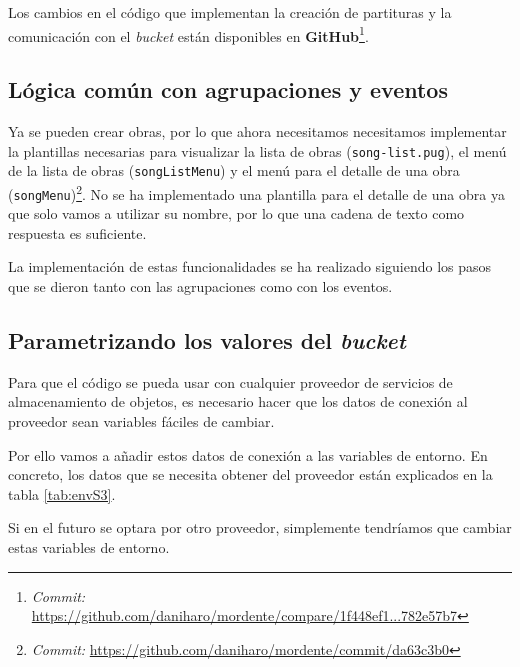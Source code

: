 Los cambios en el código que implementan la creación de partituras y la comunicación con el \textit{bucket} están disponibles en \textbf{GitHub}\footnote{\textit{Commit:} \url{https://github.com/daniharo/mordente/compare/1f448ef1...782e57b7}}.

\subsection{Lógica común con agrupaciones y eventos}

Ya se pueden crear obras, por lo que ahora necesitamos necesitamos implementar la plantillas necesarias para visualizar la lista de obras (\texttt{song-list.pug}), el menú de la lista de obras (\texttt{songListMenu}) y el menú para el detalle de una obra (\texttt{songMenu})\footnote{\textit{Commit:} \url{https://github.com/daniharo/mordente/commit/da63c3b0}}. No se ha implementado una plantilla para el detalle de una obra ya que solo vamos a utilizar su nombre, por lo que una cadena de texto como respuesta es suficiente.

La implementación de estas funcionalidades se ha realizado siguiendo los pasos que se dieron tanto con las agrupaciones como con los eventos.

\subsection{Parametrizando los valores del \textit{bucket}}


Para que el código se pueda usar con cualquier proveedor de servicios de almacenamiento de objetos, es necesario hacer que los datos de conexión al proveedor sean variables fáciles de cambiar.

Por ello vamos a añadir estos datos de conexión a las variables de entorno. En concreto, los datos que se necesita obtener del proveedor están explicados en la tabla \ref{tab:envS3}.

Si en el futuro se optara por otro proveedor, simplemente tendríamos que cambiar estas variables de entorno.

